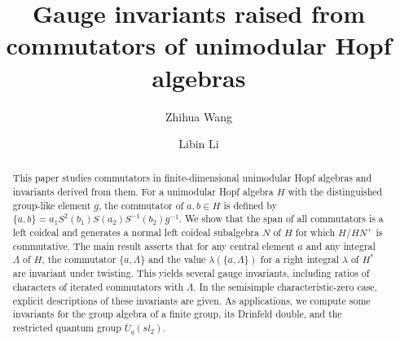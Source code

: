 \documentclass[11pt]{amsart}
\numberwithin{equation}{section}
\begin{document}
\title[Gauge invariants raised from commutators of unimodular Hopf algebras]{Gauge invariants raised from commutators of unimodular Hopf algebras}
\author{Zhihua Wang}
\address{Z. Wang\newline School of Statistics and Data Science, Taizhou University,
Taizhou 225300, China}
\author{Libin Li}
\address{L. Li\newline School of Mathematical Science, Yangzhou University, Yangzhou 225002, China}
\date{}

\begin{abstract}
This paper studies commutators in finite-dimensional unimodular Hopf algebras and invariants derived from them. For a unimodular Hopf algebra 
$H$ with the distinguished group-like element $g$, the commutator of $a,b\in H$ is defined by $\{a,b\}=a_{1}S^{2}(b_{1})S(a_{2})S^{-1}(b_{2})g^{-1}$. 
We show that the span of all commutators is a left coideal and generates a normal left coideal subalgebra $N$ of $H$ for which $H/HN^{+}$ is commutative.
The main result asserts that for any central element $a$ and any integral $\Lambda$ of $H$, the commutator $\{a,\Lambda\}$ and the value $\lambda(\{a,\Lambda\})$ for a right integral $\lambda$ of $H^*$ are invariant under twisting. This yields several gauge invariants, including ratios of characters of iterated commutators with $\Lambda$. In the semisimple characteristic-zero case, explicit descriptions of these invariants are given. As applications, we compute some invariants for the group algebra of a finite group, its Drinfeld double, and the restricted quantum group $\overline{U}_{q}(sl_{2})$.
\end{abstract}
\maketitle
\end{document}
